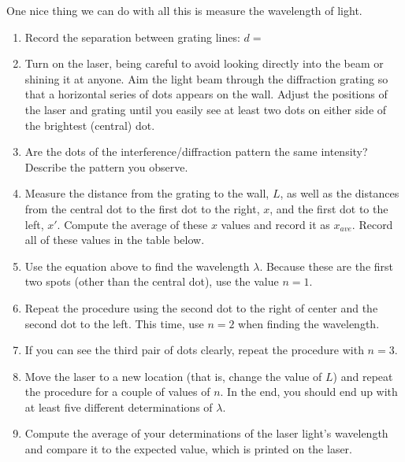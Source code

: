 One nice thing we can do with all this is measure the wavelength of light.

\bigskip
\bigskip

\begin{enumerate}
\item Record the separation between grating lines: \( d= \)
\item Turn on the laser, being careful to avoid looking directly into the
beam or shining it at anyone. Aim the light beam through the diffraction
grating so that a horizontal series of dots appears on the wall. Adjust
the positions of the laser and grating until you easily see at least
two dots on either side of the brightest (central) dot.
\item Are the dots of the interference/diffraction pattern the same intensity?
Describe the pattern you observe.\answerspace{15mm}

\item Measure the distance from the grating to the wall, $L$,
as well as the distances from the central dot to the first dot to
the right, $x$, and the first dot to the left, $x'$. Compute the average
of these $x$ values and record it as $x_{ave}$. Record all of these
values in the table below.
\item Use the equation above to find the wavelength $\lambda$.
Because these are the first two spots (other than the central dot),
use the value $n=1$.
\item Repeat the procedure using the second dot to the right
of center and the second dot to the left.  This time, use $n=2$ 
when finding the wavelength.
\item If you can see the third pair of dots clearly, repeat the
procedure with $n=3$.
\item Move the laser to a new location (that is, change the
value of $L$) and repeat the procedure for a couple of values
of $n$.  In the end, you should end up with at least
five different determinations of $\lambda$.
\item Compute the average of your determinations of the laser light's
  wavelength and compare it to the expected value, which is printed on the
  laser.
\answerspace{15mm}

\end{enumerate}
\answerspace{0.3cm}
